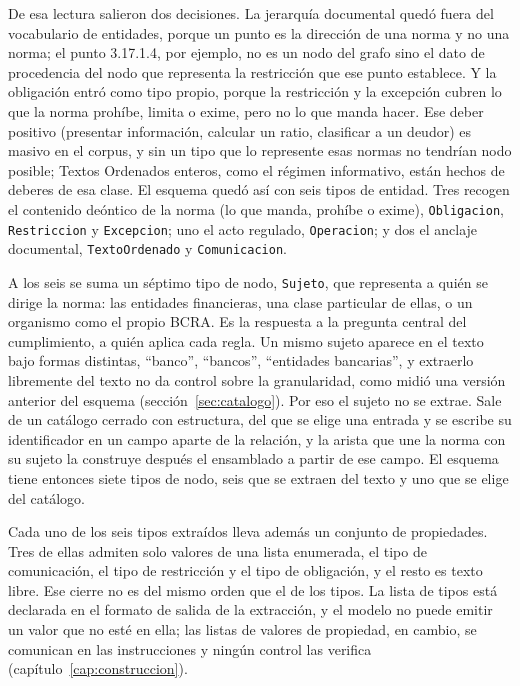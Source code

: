 \documentclass[12pt,a4paper]{report}
\begin{document}
De esa lectura salieron dos decisiones. La jerarquía documental quedó fuera del vocabulario de entidades, porque un punto es la dirección de una norma y no una norma; el punto 3.17.1.4, por ejemplo, no es un nodo del grafo sino el dato de procedencia del nodo que representa la restricción que ese punto establece. Y la obligación entró como tipo propio, porque la restricción y la excepción cubren lo que la norma prohíbe, limita o exime, pero no lo que manda hacer. Ese deber positivo (presentar información, calcular un ratio, clasificar a un deudor) es masivo en el corpus, y sin un tipo que lo represente esas normas no tendrían nodo posible; Textos Ordenados enteros, como el régimen informativo, están hechos de deberes de esa clase. El esquema quedó así con seis tipos de entidad. Tres recogen el contenido deóntico de la norma (lo que manda, prohíbe o exime), \texttt{Obligacion}, \texttt{Restriccion} y \texttt{Excepcion}; uno el acto regulado, \texttt{Operacion}; y dos el anclaje documental, \texttt{TextoOrdenado} y \texttt{Comunicacion}.

A los seis se suma un séptimo tipo de nodo, \texttt{Sujeto}, que representa a quién se dirige la norma: las entidades financieras, una clase particular de ellas, o un organismo como el propio BCRA. Es la respuesta a la pregunta central del cumplimiento, a quién aplica cada regla. Un mismo sujeto aparece en el texto bajo formas distintas, \enquote{banco}, \enquote{bancos}, \enquote{entidades bancarias}, y extraerlo libremente del texto no da control sobre la granularidad, como midió una versión anterior del esquema (sección~\ref{sec:catalogo}). Por eso el sujeto no se extrae. Sale de un catálogo cerrado con estructura, del que se elige una entrada y se escribe su identificador en un campo aparte de la relación, y la arista que une la norma con su sujeto la construye después el ensamblado a partir de ese campo. El esquema tiene entonces siete tipos de nodo, seis que se extraen del texto y uno que se elige del catálogo.

Cada uno de los seis tipos extraídos lleva además un conjunto de propiedades. Tres de ellas admiten solo valores de una lista enumerada, el tipo de comunicación, el tipo de restricción y el tipo de obligación, y el resto es texto libre. Ese cierre no es del mismo orden que el de los tipos. La lista de tipos está declarada en el formato de salida de la extracción, y el modelo no puede emitir un valor que no esté en ella; las listas de valores de propiedad, en cambio, se comunican en las instrucciones y ningún control las verifica (capítulo~\ref{cap:construccion}).
\end{document}

